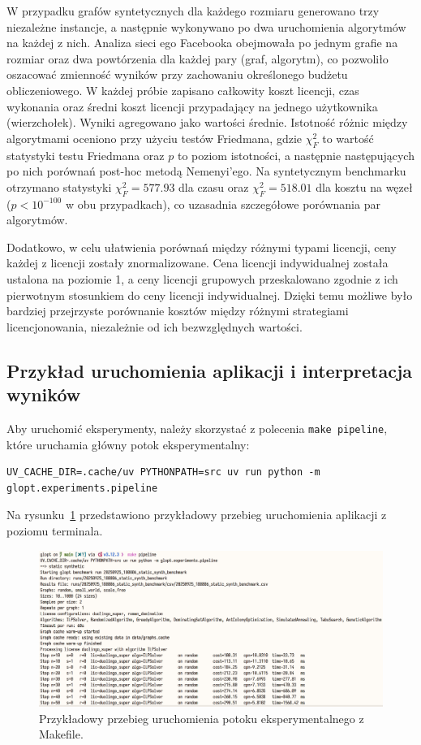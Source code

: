 W przypadku grafów syntetycznych dla każdego rozmiaru generowano trzy niezależne instancje, a następnie wykonywano po dwa uruchomienia algorytmów na każdej z nich. Analiza sieci ego Facebooka obejmowała po jednym grafie na rozmiar oraz dwa powtórzenia dla każdej pary (graf, algorytm), co pozwoliło oszacować zmienność wyników przy zachowaniu określonego budżetu obliczeniowego. W każdej próbie zapisano całkowity koszt licencji, czas wykonania oraz średni koszt licencji przypadający na jednego użytkownika (wierzchołek). Wyniki agregowano jako wartości średnie. Istotność różnic między algorytmami oceniono przy użyciu testów Friedmana, gdzie $\chi^2_F$ to wartość statystyki testu Friedmana oraz $p$ to poziom istotności, a następnie następujących po nich porównań post-hoc metodą Nemenyi'ego. Na syntetycznym benchmarku otrzymano statystyki $\chi^2_F = 577.93$ dla czasu oraz $\chi^2_F = 518.01$ dla kosztu na węzeł ($p < 10^{-100}$ w obu przypadkach), co uzasadnia szczegółowe porównania par algorytmów.

Dodatkowo, w celu ułatwienia porównań między różnymi typami licencji, ceny każdej z licencji zostały znormalizowane. Cena licencji indywidualnej została ustalona na poziomie 1, a ceny licencji grupowych przeskalowano zgodnie z ich pierwotnym stosunkiem do ceny licencji indywidualnej. Dzięki temu możliwe było bardziej przejrzyste porównanie kosztów między różnymi strategiami licencjonowania, niezależnie od ich bezwzględnych wartości.

\subsection{Przykład uruchomienia aplikacji i interpretacja wyników}

Aby uruchomić eksperymenty, należy skorzystać z polecenia \texttt{make pipeline}, które uruchamia główny potok eksperymentalny:
\begin{verbatim}
UV_CACHE_DIR=.cache/uv PYTHONPATH=src uv run python -m glopt.experiments.pipeline
\end{verbatim}

Na rysunku~\ref{fig:cli-content} przedstawiono przykładowy przebieg uruchomienia aplikacji z poziomu terminala.

\begin{figure}[H]
  \centering
  \includegraphics[width=0.95\linewidth]{assets/cli-content.png}
  \caption{Przykładowy przebieg uruchomienia potoku eksperymentalnego z Makefile.}
  \label{fig:cli-content}
\end{figure}

